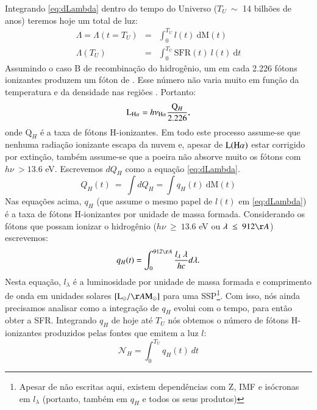 Integrando \eqref{eq:dLambda} dentro do tempo do Universo ($T_U\ \sim$ 14 bilhões de anos) teremos
hoje um total de luz:
\begin{eqnarray}
	\Lambda = \Lambda(t = T_U) &=& \int_0^{T_U} l(t)\ \textrm{d}\textrm{M}(t) \\
	\Lambda(T_U) &=& \int_0^{T_U} \mathrm{SFR}(t)\ l(t)\ \textrm{d}t
	\label{eq:Lambda}
\end{eqnarray}
\noindent Assumindo o caso B de recombinação do hidrogênio, um em cada 2.226 fótons
ionizantes produzem um fóton de \Halpha \citep{Osterbrock.Ferland.2006a}. Esse número não varia
muito em função da temperatura e da densidade nas regiões \Hii. Portanto:
\begin{equation}
	\LHalpha = h \nu_{\Halpha} \frac{\mathrm{Q}_H}{2.226},
	\label{eq:LHa_recomb_theory}
\end{equation}
\noindent onde $\mathrm{Q}_H$ é a taxa de fótons H-ionizantes. Em todo este processo assume-se que
nenhuma radiação ionizante escapa da nuvem e, apesar de $\mathrm{L}(\Halpha)$ estar corrigido por
extinção, também assume-se que a poeira não absorve muito os fótons com $h\nu\ > 13.6$ eV.
Escrevemos $dQ_H$ como a equação \eqref{eq:dLambda}.
\begin{equation}
	Q_H(t)\ =\ \int dQ_H = \int q_H(t)\ \mathrm{d}\mathrm{M}(t) 
	\label{eq:QH_t}
\end{equation}
\noindent Nas equações acima, $q_H$ (que assume o mesmo papel de $l(t)$ em \eqref{eq:dLambda}) é a
taxa de fótons H-ionizantes por unidade de massa formada. Considerando os fótons que possam ionizar
o hidrogênio ($h\nu\ \geq\ 13.6$ eV ou $\lambda\ \leq\ 912\AA$) escrevemos:
\begin{equation}
	q_H(t) = \int_0^{912\AA} \frac{l_\lambda\ \lambda}{h c} d\lambda.
	\label{eq:qH}
\end{equation}
\noindent Nesta equação, $l_\lambda$ é a luminosidade por unidade de massa formada e comprimento de
onda em unidades solares $[\textrm{L}_\odot/\AA\textrm{M}_\odot]$ para uma SSP\footnote{Apesar de
não escritas aqui, existem dependências com Z, IMF e isócronas em $l_\lambda$ (portanto, também em
$q_H$ e todos os seus produtos)}. Com isso, nós ainda precisamos analisar como a integração de
$q_H$ evolui com o tempo, para então obter a SFR. Integrando $q_H$ de hoje até $T_U$ nós
obtemos o número de fótons H-ionizantes produzidos pelas fontes que emitem a luz $l$:
\begin{equation}
	\mathcal{N}_H = \int_0^{T_U} q_H(t)\ dt
	\label{eq:Nh}
\end{equation}

